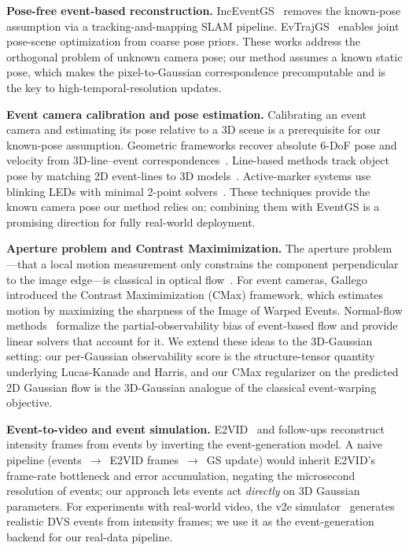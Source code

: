 \noindent\textbf{Pose-free event-based reconstruction.}
IncEventGS~\cite{inceventgs} removes the known-pose assumption via a tracking-and-mapping SLAM pipeline. EvTrajGS~\cite{evtrajgs} enables joint pose-scene optimization from coarse pose priors. These works address the orthogonal problem of unknown camera pose; our method assumes a known static pose, which makes the pixel-to-Gaussian correspondence precomputable and is the key to high-temporal-resolution updates.

\noindent\textbf{Event camera calibration and pose estimation.}
Calibrating an event camera and estimating its pose relative to a 3D scene is a prerequisite for our known-pose assumption. Geometric frameworks recover absolute 6-DoF pose and velocity from 3D-line--event correspondences~\cite{liu2026eventpose}. Line-based methods track object pose by matching 2D event-lines to 3D models~\cite{liu2024lopet}. Active-marker systems use blinking LEDs with minimal 2-point solvers~\cite{yuan2026p2p}. These techniques provide the known camera pose our method relies on; combining them with EventGS is a promising direction for fully real-world deployment.

\noindent\textbf{Aperture problem and Contrast Maximimization.}
The aperture problem---that a local motion measurement only constrains the component perpendicular to the image edge---is classical in optical flow~\cite{barron1994aperture}. For event cameras, Gallego \etal~\cite{gallego2018contrast} introduced the Contrast Maximimization (CMax) framework, which estimates motion by maximizing the sharpness of the Image of Warped Events. Normal-flow methods~\cite{ren2024evlinear} formalize the partial-observability bias of event-based flow and provide linear solvers that account for it. We extend these ideas to the 3D-Gaussian setting: our per-Gaussian observability score is the structure-tensor quantity underlying Lucas-Kanade and Harris, and our CMax regularizer on the predicted 2D Gaussian flow is the 3D-Gaussian analogue of the classical event-warping objective.

\noindent\textbf{Event-to-video and event simulation.}
E2VID~\cite{rebecq2019e2vid} and follow-ups reconstruct intensity frames from events by inverting the event-generation model. A naive pipeline (events~$\to$~E2VID frames~$\to$~GS update) would inherit E2VID's frame-rate bottleneck and error accumulation, negating the microsecond resolution of events; our approach lets events act \emph{directly} on 3D Gaussian parameters. For experiments with real-world video, the v2e simulator~\cite{hu2021v2e} generates realistic DVS events from intensity frames; we use it as the event-generation backend for our real-data pipeline.

